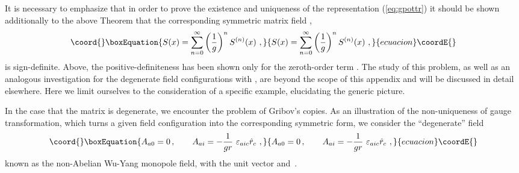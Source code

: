 \documentclass[a4paper,12pt]{article}
\begin{document}
It is necessary to emphasize that in order to prove
the existence and uniqueness of the representation (\ref{eq:gpottr})
it should be shown additionally to the above {\sf Theorem} that the
corresponding symmetric matrix field \coordHE{},
\begin{equation}\coord{}\boxEquation{\label{eq:sex}
S(x) = \sum_{n=0}^{\infty}
\left(\frac{1}{g}\right)^n S^{(n)}(x)~,
}{S(x) = \sum_{n=0}^{\infty}
\left(\frac{1}{g}\right)^n S^{(n)}(x)~,
}{ecuacion}\coordE{}\end{equation}
is sign-definite. Above, the positive-definiteness has been shown
only for the zeroth-order term \coordHE{}.
The study of this problem,
as well as an analogous investigation for the degenerate field configurations \coordHE{}
with \coordHE{}, are
beyond the scope of this appendix and will be discussed in detail elsewhere.
Here we limit ourselves to the consideration of a specific example,
elucidating the generic picture.

In the case that the matrix \coordHE{} is degenerate, we encounter the problem
of Gribov's copies.
As an illustration of the non-uniqueness of gauge transformation, which
turns a given field configuration \coordHE{} into the corresponding symmetric form,
we consider the ``degenerate'' field
\begin{equation}\coord{}\boxEquation{
\label{eq:wu-yang}
A_{a0} = 0\,, \qquad
A_{ai} = - \frac{1}{g r}\  \varepsilon_{aic}\hat{r}_c~,
}{
A_{a0} = 0\,, \qquad
A_{ai} = - \frac{1}{g r}\  \varepsilon_{aic}\hat{r}_c~,
}{ecuacion}\coordE{}\end{equation}
known as the non-Abelian Wu-Yang monopole field, with the unit vector
\coordHE{} and \coordHE{}\,.
\end{document}
